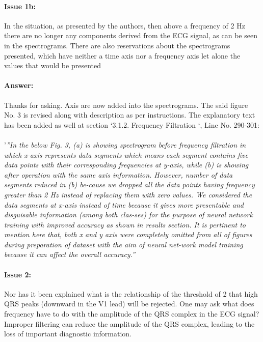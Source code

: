 \documentclass{article}
\begin{document}
\paragraph{Issue 1b:}
\begin{displayquote}
In the situation, as presented by the authors, then above a frequency of 2 Hz there are no longer any components derived from the ECG signal, as can be seen in the spectrograms. There are also reservations about the spectrograms presented, which have neither a time axis nor a frequency axis let alone the values that would be presented
\end{displayquote}

\paragraph{Answer:}
Thanks for asking. Axis are now added into the spectrograms. The said figure No. 3 is revised along with description as per instructions.
The explanatory text has been added as well at section `3.1.2. Frequency Filtration `, Line No. 290-301: \\\\  '\textit{''In the below Fig. 3, (a) is showing spectrogram before frequency filtration in which x-axis represents data segments which means each segment contains five data points with their corresponding frequencies at y-axis, while (b) is showing after operation with the same axis information. However, number of data segments reduced in (b) be-cause we dropped all the data points having frequency greater than 2 Hz instead of replacing them with zero values. We considered the data segments at x-axis instead of time because it gives more presentable and disguisable information (among both clas-ses) for the purpose of neural network training with improved accuracy as shown in results section. It is pertinent to mention here that, both x and y axis were completely omitted from all of figures during preparation of dataset with the aim of neural net-work model training because it can affect the overall accuracy.''}

\paragraph{Issue 2:}
\begin{displayquote}
Nor has it been explained what is the relationship of the threshold of 2 that high QRS peaks (downward in the V1 lead) will be rejected. One may ask what does frequency have to do with the amplitude of the QRS complex in the ECG signal? Improper filtering can reduce the amplitude of the QRS complex, leading to the loss of important diagnostic information.
\end{displayquote}
\end{document}
